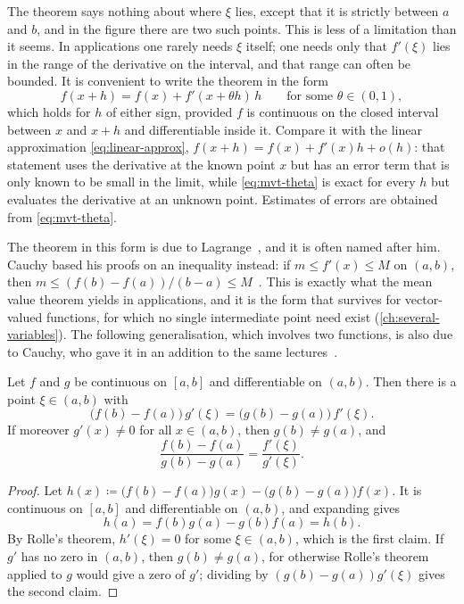 The theorem says nothing about where $\xi$ lies, except that it is strictly between $a$ and $b$, and in the figure there are two such points. This is less of a limitation than it seems. In applications one rarely needs $\xi$ itself; one needs only that $f'(\xi)$ lies in the range of the derivative on the interval, and that range can often be bounded. It is convenient to write the theorem in the form
\begin{equation}
f(x+h)=f(x)+f'(x+\theta h)\,h\qquad\text{for some }\theta\in(0,1),
\label{eq:mvt-theta}
\end{equation}
which holds for $h$ of either sign, provided $f$ is continuous on the closed interval between $x$ and $x+h$ and differentiable inside it. Compare it with the linear approximation \eqref{eq:linear-approx}, $f(x+h)=f(x)+f'(x)h+o(h)$: that statement uses the derivative at the known point $x$ but has an error term that is only known to be small in the limit, while \eqref{eq:mvt-theta} is exact for every $h$ but evaluates the derivative at an unknown point. Estimates of errors are obtained from \eqref{eq:mvt-theta}.

The theorem in this form is due to Lagrange~\cite{lagrange1797}, and it is often named after him. Cauchy based his proofs on an inequality instead: if $m\le f'(x)\le M$ on $(a,b)$, then $m\le(f(b)-f(a))/(b-a)\le M$~\cite{cauchy1823,grabiner1981}. This is exactly what the mean value theorem yields in applications, and it is the form that survives for vector-valued functions, for which no single intermediate point need exist (\cref{ch:several-variables}). The following generalisation, which involves two functions, is also due to Cauchy, who gave it in an addition to the same lectures~\cite{cauchy1823,grabiner1981}.

\begin{theorem}
\label{thm:cauchy-mvt}
Let $f$ and $g$ be continuous on $[a,b]$ and differentiable on $(a,b)$. Then there is a point $\xi\in(a,b)$ with
\[
\bigl(f(b)-f(a)\bigr)\,g'(\xi)=\bigl(g(b)-g(a)\bigr)\,f'(\xi).
\]
If moreover $g'(x)\ne0$ for all $x\in(a,b)$, then $g(b)\ne g(a)$, and
\[
\frac{f(b)-f(a)}{g(b)-g(a)}=\frac{f'(\xi)}{g'(\xi)} .
\]
\end{theorem}

\begin{proof}
Let $h(x)\coloneqq\bigl(f(b)-f(a)\bigr)g(x)-\bigl(g(b)-g(a)\bigr)f(x)$. It is continuous on $[a,b]$ and differentiable on $(a,b)$, and expanding gives
\[
h(a)=f(b)g(a)-g(b)f(a)=h(b).
\]
By Rolle's theorem, $h'(\xi)=0$ for some $\xi\in(a,b)$, which is the first claim. If $g'$ has no zero in $(a,b)$, then $g(b)\ne g(a)$, for otherwise Rolle's theorem applied to $g$ would give a zero of $g'$; dividing by $(g(b)-g(a))g'(\xi)$ gives the second claim.
\end{proof}

